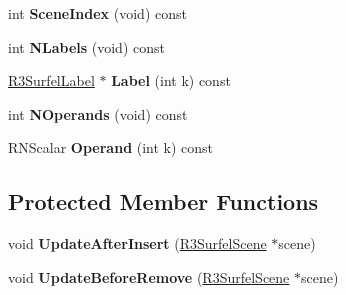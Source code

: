 \begin{DoxyCompactItemize}
\item 
int {\bfseries Scene\+Index} (void) const \hypertarget{class_r3_surfel_label_relationship_a4f364225f4571b94dd6704c3f10a4873}{}\label{class_r3_surfel_label_relationship_a4f364225f4571b94dd6704c3f10a4873}

\item 
int {\bfseries N\+Labels} (void) const \hypertarget{class_r3_surfel_label_relationship_ad346230de5c825588dde5a0f00fe011c}{}\label{class_r3_surfel_label_relationship_ad346230de5c825588dde5a0f00fe011c}

\item 
\hyperlink{class_r3_surfel_label}{R3\+Surfel\+Label} $\ast$ {\bfseries Label} (int k) const \hypertarget{class_r3_surfel_label_relationship_a2bca8cacb9ade015223bbd093f176ef9}{}\label{class_r3_surfel_label_relationship_a2bca8cacb9ade015223bbd093f176ef9}

\item 
int {\bfseries N\+Operands} (void) const \hypertarget{class_r3_surfel_label_relationship_a57dc73ea095f5640391094385b6e50c4}{}\label{class_r3_surfel_label_relationship_a57dc73ea095f5640391094385b6e50c4}

\item 
R\+N\+Scalar {\bfseries Operand} (int k) const \hypertarget{class_r3_surfel_label_relationship_aa61dbfd72580234597e21e05edb19484}{}\label{class_r3_surfel_label_relationship_aa61dbfd72580234597e21e05edb19484}

\end{DoxyCompactItemize}
\subsection*{Protected Member Functions}
\begin{DoxyCompactItemize}
\item 
void {\bfseries Update\+After\+Insert} (\hyperlink{class_r3_surfel_scene}{R3\+Surfel\+Scene} $\ast$scene)\hypertarget{class_r3_surfel_label_relationship_a776ecc9c7f71c710c723cb163747bcb8}{}\label{class_r3_surfel_label_relationship_a776ecc9c7f71c710c723cb163747bcb8}

\item 
void {\bfseries Update\+Before\+Remove} (\hyperlink{class_r3_surfel_scene}{R3\+Surfel\+Scene} $\ast$scene)\hypertarget{class_r3_surfel_label_relationship_a0568cde8b34b5268ecaa6c07f9d05280}{}\label{class_r3_surfel_label_relationship_a0568cde8b34b5268ecaa6c07f9d05280}

\end{DoxyCompactItemize}
